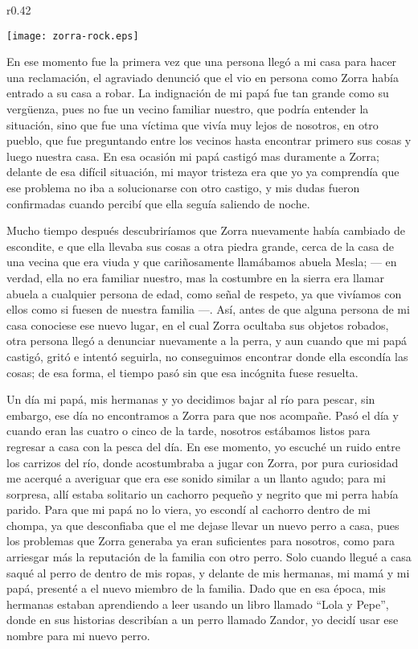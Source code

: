 \begin{wrapfigure}{r}{0.42\textwidth}
  \begin{center}
  \vspace{-10pt}
    \texttt{[image: zorra-rock.eps]}
  \end{center}
  \vspace{-20pt}
\end{wrapfigure}
En ese momento fue la primera vez que una persona llegó a mi casa para hacer una reclamación, el agraviado denunció que el vio en persona como Zorra había entrado a su casa a robar.
La indignación de mi papá fue tan grande como su vergüenza, pues no fue un vecino familiar nuestro, que podría entender la situación, sino que fue una víctima que vivía muy lejos de nosotros, en otro pueblo, que fue preguntando entre los vecinos hasta encontrar primero sus cosas y luego nuestra casa.
En esa ocasión mi papá castigó mas duramente a Zorra; delante de esa difícil situación, mi mayor tristeza era que yo ya comprendía que ese problema no iba a solucionarse con otro castigo, y mis dudas fueron confirmadas cuando percibí que ella seguía saliendo de noche.

Mucho tiempo después descubriríamos que Zorra nuevamente había cambiado de escondite, e que ella llevaba sus cosas a otra piedra grande, cerca de la casa de una vecina que era viuda y que cariñosamente llamábamos abuela Mesla; --- en verdad, ella no era familiar nuestro, mas la costumbre en la sierra era llamar abuela a cualquier persona de edad, como señal de respeto, ya que vivíamos con ellos como si fuesen de nuestra familia ---.
Así, antes de que alguna persona de mi casa conociese ese nuevo lugar, en el cual Zorra ocultaba sus objetos robados, otra persona llegó a denunciar nuevamente a la perra, y aun cuando que mi papá castigó, gritó e intentó seguirla, no conseguimos encontrar donde ella escondía las cosas; de esa forma, el tiempo pasó sin que esa incógnita fuese resuelta.

Un día mi papá, mis hermanas y yo decidimos bajar al río para pescar, sin embargo, ese día no encontramos a Zorra para que nos acompañe. Pasó el día y cuando eran las cuatro o cinco de la tarde, nosotros estábamos listos para regresar a casa con la pesca del día. En ese momento, yo escuché un ruido entre los carrizos del río, donde acostumbraba a jugar con Zorra, por pura curiosidad me acerqué a averiguar que era ese sonido similar a un llanto agudo; para mi sorpresa, allí estaba solitario un cachorro pequeño y negrito que mi perra había parido.
Para que mi papá no lo viera, yo escondí al cachorro dentro de mi chompa, ya que desconfiaba que el me dejase llevar un nuevo perro a casa, pues los problemas que Zorra generaba ya eran suficientes para nosotros, como para arriesgar más la reputación de la familia con otro perro.
Solo cuando llegué a casa saqué al perro de dentro de mis ropas, y delante de mis hermanas, mi mamá y mi papá, presenté a el nuevo miembro de la familia. Dado que en esa época, mis hermanas estaban aprendiendo a leer usando un libro llamado ``Lola y Pepe'', donde en sus historias describían a un perro llamado Zandor, yo decidí usar ese nombre para mi nuevo perro.

